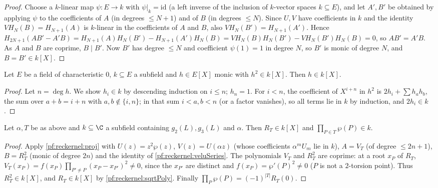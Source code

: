 \begin{proof}
Choose a $k$-linear map $\psi\colon E\to k$ with $\psi|_k=\mathrm{id}$ (a left inverse of the
inclusion of $k$-vector spaces $k\subseteq E$), and let $A',B'$ be obtained by applying $\psi$ to
the coefficients of $A$ (in degrees $\le N+1$) and of $B$ (in degrees $\le N$). Since $U,V$ have coefficients in $k$
and the identity $VH_N(B)=H_{N+1}(A)$ is $k$-linear in the coefficients of $A$ and $B$, also
$VH_N(B')=H_{N+1}(A')$. Hence
$H_{2N+1}(AB'-A'B)=H_{N+1}(A)H_N(B')-H_{N+1}(A')H_N(B)=VH_N(B)H_N(B')-VH_N(B')H_N(B)=0$, so $AB'=A'B$. As $A$ and $B$
are coprime, $B\mid B'$. Now $B'$ has degree $\le N$ and coefficient $\psi(1)=1$ in degree $N$, so $B'$ is monic of
degree $N$, and $B=B'\in k[X]$.
\end{proof}

\begin{lemma}\label{pf:reckernel:sqrtPoly}
Let $E$ be a field of characteristic $0$, $k\subseteq E$ a subfield and $h\in E[X]$ monic with $h^2\in k[X]$. Then
$h\in k[X]$.
\end{lemma}

\begin{proof}
Let $n=\deg h$. We show $h_i\in k$ by descending induction on $i\le n$; $h_n=1$. For $i<n$, the coefficient of
$X^{i+n}$ in $h^2$ is $2h_i+\sum h_ah_b$, the sum over $a+b=i+n$ with $a,b\notin\{i,n\}$; in that sum $i<a,b<n$ (or a
factor vanishes), so all terms lie in $k$ by induction, and $2h_i\in k$.
\end{proof}

\begin{lemma}\label{pf:reckernel:kerPoly}
Let $\alpha,T$ be as above and $k\subseteq\C$ a subfield containing $g_2(L),g_3(L)$ and $\alpha$. Then $R_T\in k[X]$
and $\prod_{P\in T}\wp(P)\in k$.
\end{lemma}

\begin{proof}
Apply \cref{pf:reckernel:proj} with $U(z)=z^2\wp(z)$, $V(z)=U(\alpha z)$ (whose coefficients $\alpha^mU_m$ lie in $k$),
$A=V_T$ (of degree $\le2n+1$), $B=R_T^2$ (monic of degree $2n$) and the identity of \cref{pf:reckernel:veluSeries}.
The polynomials $V_T$ and $R_T^2$ are coprime: at a root $x_P$ of $R_T$,
$V_T(x_P)=f(x_P)\prod_{P'\ne P}(x_P-x_{P'})^2\ne0$, since the $x_{P'}$ are distinct and $f(x_P)=\wp'(P)^2\ne0$ ($P$ is
not a $2$-torsion point). Thus $R_T^2\in k[X]$, and $R_T\in k[X]$ by \cref{pf:reckernel:sqrtPoly}. Finally
$\prod_P\wp(P)=(-1)^{|T|}R_T(0)$.
\end{proof}

